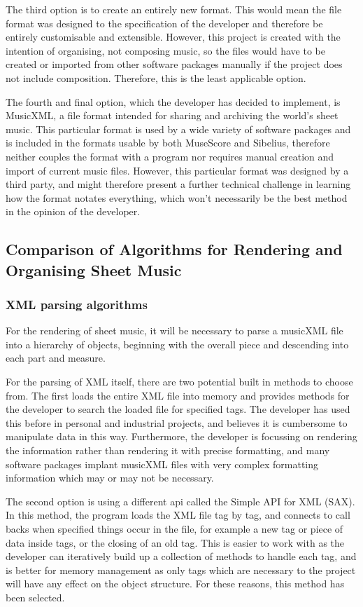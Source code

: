 The third option is to create an entirely new format. This would mean the file format was designed to the specification of the developer and therefore be entirely customisable and extensible. However, this project is created with the intention of organising, not composing music, so the files would have to be created or imported from other software packages manually if the project does not include composition. Therefore, this is the least applicable option.

The fourth and final option, which the developer has decided to implement, is MusicXML, a file format intended for sharing and archiving the world's sheet music\parencite{mxml}. This particular format is used by a wide variety of software packages\parencite{mxml} and is included in the formats usable by both MuseScore\parencite{MuseTour} and Sibelius\parencite{avid}, therefore neither couples the format with a program nor requires manual creation and import of current music files. However, this particular format was designed by a third party, and might therefore present a further technical challenge in learning how the format notates everything, which won't necessarily be the best method in the opinion of the developer.

\subsection{Comparison of Algorithms for Rendering and Organising Sheet Music}
\subsubsection{XML parsing algorithms}
For the rendering of sheet music, it will be necessary to parse a musicXML file into a hierarchy of objects, beginning with the overall piece and descending into each part and measure. 

For the parsing of XML itself, there are two potential built in methods to choose from. The first loads the entire XML file into memory and provides methods for the developer to search the loaded file for specified tags. The developer has used this before in personal and industrial projects, and believes it is cumbersome to manipulate data in this way. Furthermore, the developer is focussing on rendering the information rather than rendering it with precise formatting, and many software packages implant musicXML files with very complex formatting information which may or may not be necessary.

The second option is using a different api called the Simple API for XML (SAX). In this method, the program loads the XML file tag by tag, and connects to call backs when specified things occur in the file, for example a new tag or piece of data inside tags, or the closing of an old tag. This is easier to work with as the developer can iteratively build up a collection of methods to handle each tag, and is better for memory management as only tags which are necessary to the project will have any effect on the object structure. For these reasons, this method has been selected.

